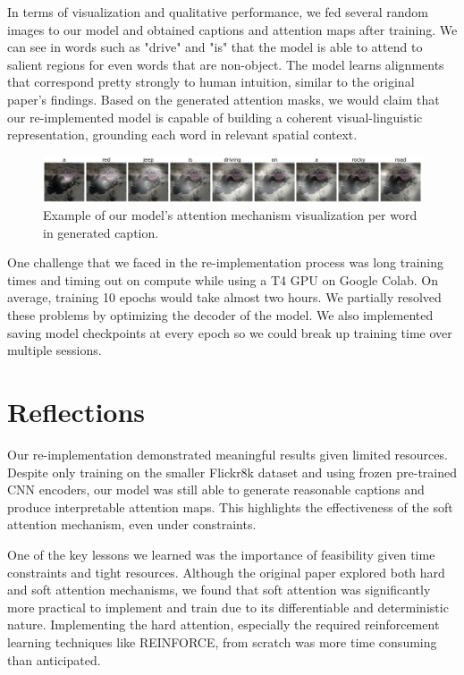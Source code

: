 \documentclass{article}
\begin{document}
In terms of visualization and qualitative performance, we fed several random images to our model and obtained captions and attention maps after training. We can see in words such as "drive" and "is" that the model is able to attend to salient regions for even words that are non-object. The model learns alignments that correspond pretty strongly to human intuition, similar to the original paper's findings. Based on the generated attention masks, we would claim that our re-implemented model is capable of building a coherent visual-linguistic representation, grounding each word in relevant spatial context. 

\begin{figure}[h]
    \centering
    \includegraphics[width=0.75\linewidth]{example-jeep.png}
    \caption{Example of our model's attention mechanism visualization per word in generated caption.}
    \label{fig:enter-label}
\end{figure}

One challenge that we faced in the re-implementation process was long training times and timing out on compute while using a T4 GPU on Google Colab. On average, training 10 epochs would take almost two hours. We partially resolved these problems by optimizing the decoder of the model. We also implemented saving model checkpoints at every epoch so we could break up training time over multiple sessions.

\section{Reflections}


Our re-implementation demonstrated meaningful results given limited resources. Despite only training on the smaller Flickr8k dataset and using frozen pre-trained CNN encoders, our model was still able to generate reasonable captions and produce interpretable attention maps. This highlights the effectiveness of the soft attention mechanism, even under constraints.

One of the key lessons we learned was the importance of feasibility given time constraints and tight resources. Although the original paper explored both hard and soft attention mechanisms, we found that soft attention was significantly more practical to implement and train due to its differentiable and deterministic nature. Implementing the hard attention, especially the required reinforcement learning techniques like REINFORCE, from scratch was more time consuming than anticipated.
\end{document}
